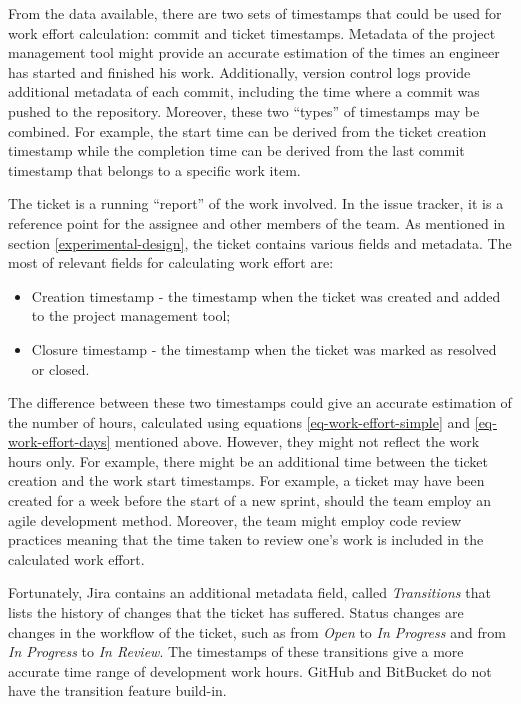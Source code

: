 \documentclass{mpaper}
\begin{document}
From the data available, there are two sets of timestamps that could be used for
work effort calculation: commit and ticket timestamps. Metadata of the project
management tool might provide an accurate estimation of the times an engineer
has started and finished his work. Additionally, version control logs provide
additional metadata of each commit, including the time where a commit was pushed
to the repository. Moreover, these two ``types'' of timestamps may be combined.
For example, the start time can be derived from the ticket creation timestamp
while the completion time can be derived from the last commit timestamp that
belongs to a specific work item.

The ticket is a running ``report'' of the work involved. In the issue tracker,
it is a reference point for the assignee and other members of the team. As
mentioned in section \ref{experimental-design}, the ticket contains various
fields and metadata. The most of relevant fields for calculating work effort are:

\begin{itemize}
  \item Creation timestamp - the timestamp when the ticket was created and added
  to the project management tool;
  \item Closure timestamp - the timestamp when the ticket was marked as resolved
  or closed.  
\end{itemize}

The difference between these two timestamps could give an accurate estimation of
the number of hours, calculated using equations \ref{eq-work-effort-simple} and
\ref{eq-work-effort-days} mentioned above. However, they might not reflect the
work hours only. For example, there might be an additional time between the
ticket creation and the work start timestamps. For example, a ticket may have
been created for a week before the start of a new sprint, should the team employ
an agile development method. Moreover, the team might employ code review
practices meaning that the time taken to review one's work is included in the
calculated work effort. 

Fortunately, Jira contains an additional metadata field, called
\emph{Transitions} that lists the history of changes that the ticket has
suffered. Status changes are changes in the workflow of the ticket, such as from
\emph{Open} to \emph{In Progress} and from \emph{In Progress} to \emph{In
Review}. The timestamps of these transitions give a more accurate time range of
development work hours. GitHub and BitBucket do not have the transition feature
build-in.
\end{document}
